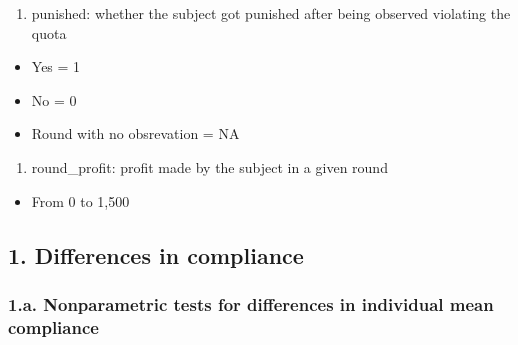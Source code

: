 \documentclass[
]{article}
\providecommand{\tightlist}{%
  \setlength{\itemsep}{0pt}\setlength{\parskip}{0pt}}
\begin{document}
\begin{enumerate}
\def\labelenumi{\arabic{enumi})}
\setcounter{enumi}{10}
\tightlist
\item
  punished: whether the subject got punished after being observed
  violating the quota
\end{enumerate}

\begin{itemize}
\tightlist
\item
  Yes = 1
\item
  No = 0
\item
  Round with no obsrevation = NA
\end{itemize}

\begin{enumerate}
\def\labelenumi{\arabic{enumi})}
\setcounter{enumi}{11}
\tightlist
\item
  round\_profit: profit made by the subject in a given round
\end{enumerate}

\begin{itemize}
\tightlist
\item
  From 0 to 1,500
\end{itemize}

\hypertarget{differences-in-compliance}{%
\subsection{1. Differences in
compliance}\label{differences-in-compliance}}

\hypertarget{a.-nonparametric-tests-for-differences-in-individual-mean-compliance}{%
\subsubsection{1.a. Nonparametric tests for differences in individual
mean
compliance}\label{a.-nonparametric-tests-for-differences-in-individual-mean-compliance}}
\end{document}
